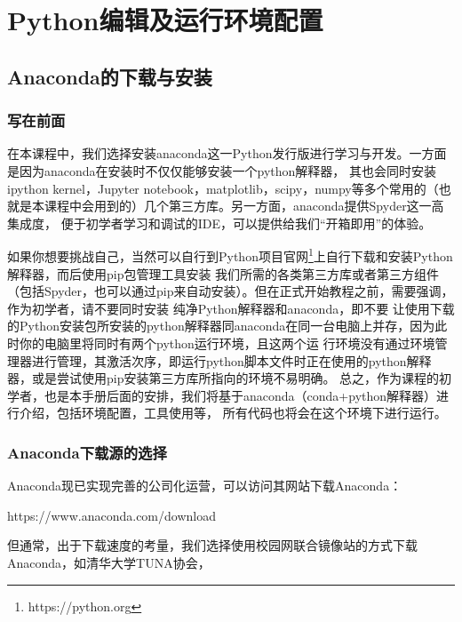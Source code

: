 \chapter{Python编辑及运行环境配置}
\section{Anaconda的下载与安装}
\subsection{写在前面}
在本课程中，我们选择安装anaconda这一Python发行版进行学习与开发。一方面是因为anaconda在安装时不仅仅能够安装一个python解释器，
其也会同时安装ipython kernel，Jupyter notebook，matplotlib，scipy，numpy等多个常用的（也就是本课程中会用到的）几个第三方库。另一方面，anaconda提供Spyder这一高集成度，
便于初学者学习和调试的IDE，可以提供给我们“开箱即用”的体验。

如果你想要挑战自己，当然可以自行到Python项目官网\footnote{https://python.org}上自行下载和安装Python解释器，而后使用pip包管理工具安装
我们所需的各类第三方库或者第三方组件（包括Spyder，也可以通过pip来自动安装）。但在正式开始教程之前，需要强调，作为初学者，请不要同时安装
纯净Python解释器和anaconda，即不要
让使用下载的Python安装包所安装的python解释器同anaconda在同一台电脑上并存，因为此时你的电脑里将同时有两个python运行环境，且这两个运
行环境没有通过环境管理器进行管理，其激活次序，即运行python脚本文件时正在使用的python解释器，或是尝试使用pip安装第三方库所指向的环境不易明确。
总之，作为课程的初学者，也是本手册后面的安排，我们将基于anaconda（conda+python解释器）进行介绍，包括环境配置，工具使用等，
所有代码也将会在这个环境下进行运行。
\subsection{Anaconda下载源的选择}
Anaconda现已实现完善的公司化运营，可以访问其网站下载Anaconda：

https://www.anaconda.com/download

但通常，出于下载速度的考量，我们选择使用校园网联合镜像站的方式下载Anaconda，如清华大学TUNA协会，